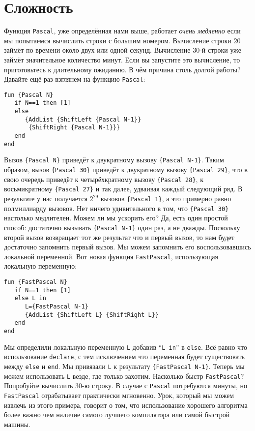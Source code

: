 \section{Сложность}\label{section:complexity}

Функция \lstinline|Pascal|, уже определённая нами выше, работает \emph{очень медленно} если мы попытаемся вычислить строки с большим номером. Вычисление строки $20$ займёт по времени около двух или одной секунд. Вычисление $30$-й строки уже займёт значительное количество минут. Если вы запустите это вычисление, то приготовьтесь к длительному ожиданию. В чём причина столь долгой работы? Давайте ещё раз взглянем на функцию \lstinline|Pascal|:

\begin{lstlisting}
fun {Pascal N}
   if N==1 then [1]
   else
      {AddList {ShiftLeft {Pascal N-1}}
       {ShiftRight {Pascal N-1}}}
   end
end
\end{lstlisting}


Вызов \lstinline|{Pascal N}| приведёт к двукратному вызову \lstinline|{Pascal N-1}|. Таким образом, вызов \lstinline|{Pascal 30}| приведёт к двукратному вызову \lstinline|{Pascal 29}|, что в свою очередь приведёт к четырёхкратному вызову \lstinline|{Pascal 28}|, к восьмикратному \lstinline|{Pascal 27}| и так далее, удваивая каждый следующий ряд. В результате у нас получается $2^{29}$ вызовов \lstinline|{Pascal 1}|, а это примерно равно полмиллиарду вызовов. Нет ничего удивительного в том, что \lstinline|{Pascal 30}| настолько медлителен. Можем ли мы ускорить его? Да, есть один простой способ: достаточно вызывать \lstinline|{Pascal N-1}| один раз, а не дважды. Поскольку второй вызов возвращает тот же результат что и первый вызов, то нам будет достаточно запомнить первый вызов. Мы можем запомнить его воспользовавшись локальной переменной. Вот новая функция \lstinline|FastPascal|, использующая локальную переменную:

\begin{lstlisting}
fun {FastPascal N}
   if N==1 then [1]
   else L in
      L={FastPascal N-1}
      {AddList {ShiftLeft L} {ShiftRight L}}
   end
end
\end{lstlisting}


Мы определили локальную переменную \lstinline|L| добавив ``\lstinline|L in|'' в \lstinline|else|. Всё равно что использование \lstinline|declare|, с тем исключением что переменная будет существовать между \lstinline|else| и \lstinline|end|. Мы привязали \lstinline|L| к результату \lstinline|{FastPascal N-1}|. Теперь мы можем использовать \lstinline|L| везде, где только захотим. Насколько быстр \lstinline|FastPascal|? Попробуйте вычислить $30$-ю строку. В случае с \lstinline|Pascal| потребуются минуты, но \lstinline|FastPascal| отрабатывает практически мгновенно. Урок, который мы можем извлечь из этого примера, говорит о том, что использование хорошего алгоритма более важно чем наличие самого лучшего компилятора или самой быстрой машины.


